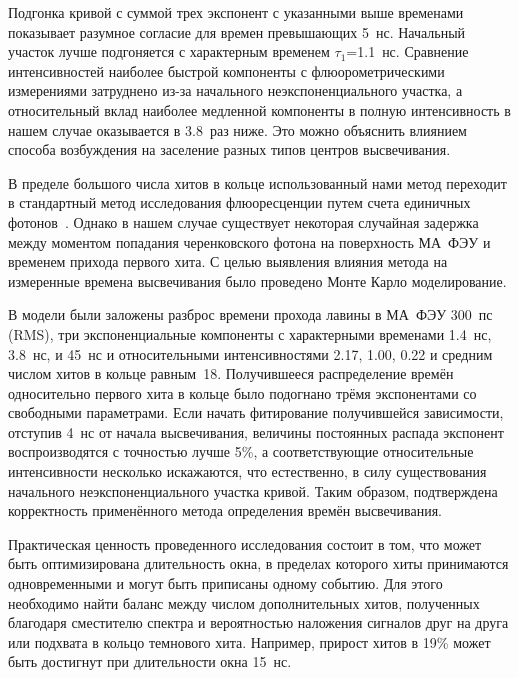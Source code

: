 


Подгонка кривой с  суммой трех экспонент с указанными выше временами показывает разумное согласие для времен превышающих 5~нс. Начальный участок лучше подгоняется с характерным временем $\tau_{1}$=1.1~нс. Сравнение интенсивностей наиболее быстрой компоненты с флюорометрическими измерениями затруднено из-за начального неэкспоненциального участка, а относительный вклад наиболее медленной компоненты в полную интенсивность в нашем случае оказывается в 3.8~раз ниже. Это можно объяснить влиянием способа возбуждения на заселение разных типов центров высвечивания.

В пределе большого числа хитов в кольце использованный нами метод переходит в стандартный метод исследования флюоресценции путем счета единичных фотонов~\cite{SPC}. Однако в нашем случае существует некоторая случайная задержка между моментом попадания черенковского фотона на поверхность МА~ФЭУ и временем прихода первого хита. С целью выявления влияния метода на измеренные времена высвечивания было проведено Монте Карло моделирование.

В модели были заложены разброс времени прохода лавины в МА~ФЭУ 300~пс (RMS), три экспоненциальные компоненты с характерными временами 1.4~нс, 3.8~нс, и 45~нс и относительными интенсивностями 2.17, 1.00, 0.22 и средним числом хитов в кольце равным~18. Получившееся распределение времён односительно первого хита в кольце было подогнано трёмя экспонентами со свободными параметрами. Если начать фитирование получившейся зависимости, отступив 4~нс от начала высвечивания, величины постоянных распада экспонент воспроизводятся с точностью лучше 5\%, а соответствующие относительные интенсивности несколько искажаются, что естественно, в силу существования начального неэкспоненциального участка кривой. Таким образом, подтверждена корректность применённого метода определения времён высвечивания.

Практическая ценность проведенного исследования состоит в том, что может быть оптимизирована длительность окна, в пределах которого хиты принимаются одновременными и могут быть приписаны одному событию. Для этого необходимо найти баланс между числом дополнительных хитов, полученных благодаря сместителю спектра и вероятностью наложения сигналов друг на друга или подхвата в кольцо темнового хита. Например, прирост хитов в 19\% может быть достигнут при длительности окна 15~нс.


% 
